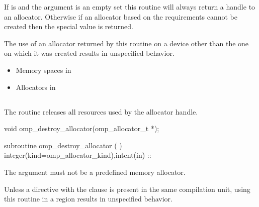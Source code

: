 If  is  and the  
argument is an empty set this routine will always return a handle to an 
allocator. Otherwise if an allocator based on the requirements cannot be 
created then the special value  is returned.

The use of an allocator returned by this routine on a device other than 
the one on which it was created results in unspecified behavior.

\crossreferences
\begin{itemize}
\item Memory spaces in 

\item Allocators in 
\end{itemize}



\subsection{}
\label{subsec:omp_destroy_allocator}

\summary
The  routine releases all resources 
used by the allocator handle.

\format
\begin{ccppspecific}
\begin{ompcFunction}
void omp_destroy_allocator(omp_allocator_t *);
\end{ompcFunction}
\end{ccppspecific}
\begin{fortranspecific}
\begin{ompfSubroutine}
subroutine omp_destroy_allocator (  )
integer(kind=omp_allocator_kind),intent(in) :: 
\end{ompfSubroutine}
\end{fortranspecific}

\constraints

The  argument must not be a predefined memory allocator.

Unless a  directive with the  
clause is present in the same compilation unit, using this routine in 
a  region results in unspecified behavior.

\binding

